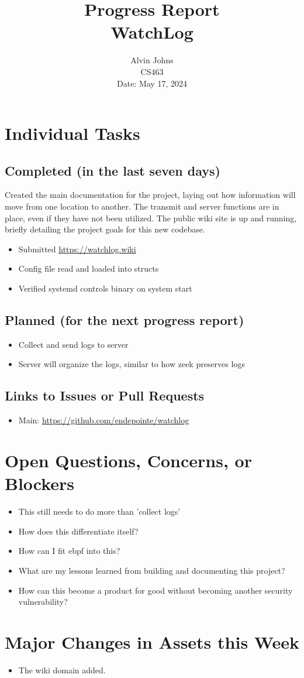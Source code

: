 \documentclass{article}
\title{Progress Report\\[0.5em]
\large WatchLog}
\author{Alvin Johns\\
CS463\\
Date: May 17, 2024}
\date{}
\begin{document}
\maketitle

\section*{Individual Tasks}
\subsection*{Completed (in the last seven days)}
Created the main documentation for the project, laying out how information will move from one location to another. The transmit and server functions are in place, even if they have not been utilized. 
The public wiki site is up and running, briefly detailing the project goals for this new codebase. 
\begin{itemize}
    \item Submitted \underline{\url{https://watchlog.wiki}}
    \item Config file read and loaded into structs
    \item Verified systemd controls binary on system start
\end{itemize}

\subsection*{Planned (for the next progress report)}
\begin{itemize}
    \item Collect and send logs to server
    \item Server will organize the logs, similar to how zeek preserves logs 
\end{itemize}

\subsection*{Links to Issues or Pull Requests}
\begin{itemize}
    \item Main: \underline{\url{https://github.com/endepointe/watchlog}}
\end{itemize}

\section*{Open Questions, Concerns, or Blockers}
\begin{itemize}
    \item This still needs to do more than 'collect logs'
    \item How does this differentiate itself?
    \item How can I fit ebpf into this?
    \item What are my lessons learned from building and documenting this project?
    \item How can this become a product for good without becoming another security vulnerability?
\end{itemize}

\section*{Major Changes in Assets this Week}
\begin{itemize}
    \item The wiki domain added.
\end{itemize}
\end{document}
